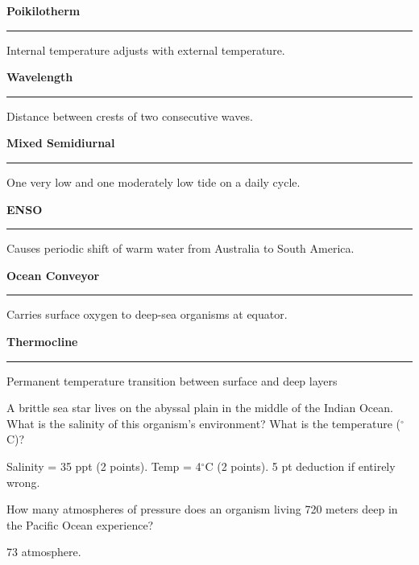 \documentclass[11pt]{exam}
\newcommand*\Matching[1]{
\ifprintanswers
	\textbf{#1}
\else
	\rule{2.1in}{0.5pt}
\fi
}
\newlength\matchlena
\newlength\matchlenb
\newcommand\MatchQuestion[2]{%
	\setlength\matchlenb{\linewidth}
	\addtolength\matchlenb{-\matchlena}
	\parbox[t]{\matchlena}{\Matching{#1}}\enspace\parbox[t]{\matchlenb}{#2}}
\begin{document}
\begin{questions}

\vspace{-1\baselineskip}
\fullwidth{%

}
\vspace{0.7\baselineskip}

\question\MatchQuestion{Poikilotherm}{Internal temperature adjusts with external temperature.}
\vspace{0.7\baselineskip}

\question\MatchQuestion{Wavelength}{Distance between crests of two consecutive waves.}
\vspace{0.7\baselineskip}

\question\MatchQuestion{Mixed Semidiurnal}{One very low and one moderately low tide on a daily cycle.}
\vspace{0.7\baselineskip}

\question\MatchQuestion{ENSO}{Causes periodic shift of warm water from Australia to South America.}
\vspace{0.7\baselineskip}

\question\MatchQuestion{Ocean Conveyor}{Carries surface oxygen to deep-sea organisms at equator.}
\vspace{0.7\baselineskip}

\question\MatchQuestion{Thermocline}{Permanent temperature transition between surface and deep layers}
\vspace{0.7\baselineskip}



\question[5]
A brittle sea star lives on the abyssal plain in the middle of the Indian Ocean.  What is the salinity of this organism's environment? What is the temperature ($^\circ$C)?
	\begin{solution}
	Salinity = 35 ppt (2 points). Temp = 4$^\circ$C (2 points). 5 pt deduction if entirely wrong.
	\end{solution}

\question[3]
How many atmospheres of pressure does an organism living 720 meters deep in the Pacific Ocean experience?

	\begin{solution}
	73 atmosphere.
	\end{solution}
\newpage


\end{questions}
\end{document}
